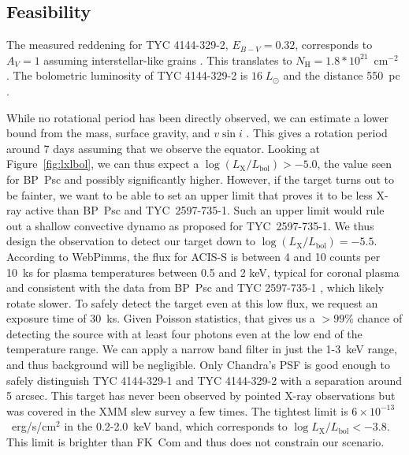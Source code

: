 \documentclass[letterpaper,11pt]{article}
\begin{document}
\subsection*{Feasibility}

The measured reddening for TYC 4144-329-2, $E_{B-V} = 0.32$, corresponds to $A_V = 1$ assuming interstellar-like grains \cite{2009ApJ...696.1964M}. This translates to $N_\mathrm{H} = 1.8*10^{21}$~cm$^{-2}$ \cite{1995A&A...293..889P}. The bolometric luminosity of TYC 4144-329-2 is $16\;L_\odot$ and the distance 550~pc \cite{2009ApJ...696.1964M}.

While no rotational period has been directly observed, we can estimate a lower bound from the mass, surface gravity, and $v\sin i$ \cite{2009ApJ...696.1964M}. This gives a rotation period around 7 days assuming that we observe the equator. Looking at Figure~\ref{fig:lxlbol}, we can thus expect a $\log(L_\mathrm{X}/L_\mathrm{bol}) > -5.0$, the value seen for BP~Psc and possibly significantly higher. However, if the target turns out to be fainter, we want to be able to set an upper limit that proves it to be less X-ray active than BP~Psc and TYC~2597-735-1. Such an upper limit would rule out a shallow convective dynamo as proposed for TYC~2597-735-1. We thus design the observation to detect our target down to  $\log(L_\mathrm{X}/L_\mathrm{bol}) = -5.5$. According to WebPimms, the flux for ACIS-S is between 4 and 10 counts per 10~ks for plasma temperatures between 0.5 and 2 keV, typical for coronal plasma and consistent with the data from BP~Psc \cite{2010ApJ...719L..65K} and TYC 2597-735-1 \cite{2022arXiv220205424G}, which likely rotate slower. To safely detect the target even at this low flux, we request an exposure time of 30~ks. Given Poisson statistics, that gives us a $>99$\% chance of detecting the source with at least four photons even at the low end of the temperature range. We can apply a narrow band filter in just the 1-3~keV range, and thus background will be negligible. Only Chandra's PSF is good enough to safely distinguish TYC 4144-329-1 and TYC 4144-329-2 with a separation around 5 arcsec. This target has never been observed by pointed X-ray observations but was covered in the XMM slew survey a few times. The tightest limit is $6\times 10^{-13}$~erg/s/cm$^2$ in the 0.2-2.0~keV band, which corresponds to $\log L_\mathrm{X}/L_\mathrm{bol} < -3.8$. This limit is brighter than FK~Com and thus does not constrain our scenario.
\end{document}
